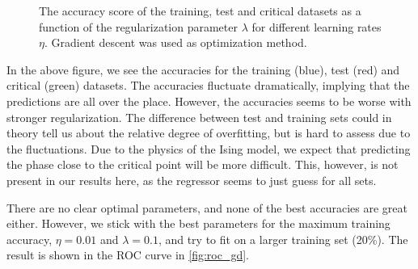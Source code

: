 \begin{figure}[H]
\qquad
{}
\caption{The accuracy score of the training, test and critical datasets as a function of the regularization parameter $\lambda$ for different learning rates $\eta$. Gradient descent was used as optimization method.}
\label{fig:gd_acc_lambda}
\end{figure}

In the above figure, we see the accuracies for the training (blue), test (red) and critical (green) datasets. The accuracies fluctuate dramatically, implying that the predictions are all over the place. However, the accuracies seems to be worse with stronger regularization. The difference between test and training sets could in theory tell us about the relative degree of overfitting, but is hard to assess due to the fluctuations. Due to the physics of the Ising model, we expect that predicting the phase close to the critical point will be more difficult. This, however, is not present in our results here, as the regressor seems to just guess for all sets.

There are no clear optimal parameters, and none of the best accuracies are great either. However, we stick with the best parameters for the maximum training accuracy, $\eta=0.01$ and $\lambda=0.1$, and try to fit on a larger training set (20\%). The result is shown in the ROC curve in \autoref{fig:roc_gd}.

